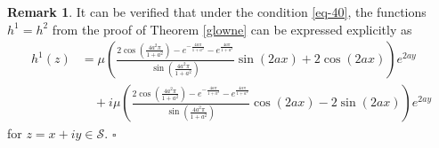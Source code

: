 \documentclass[11pt, letterpaper, reqno]{amsart}
\numberwithin{equation}{section}
\theoremstyle{definition}
\newtheorem{rem}[defi]{Remark}
\theoremstyle{plain}
\numberwithin{equation}{section}
\def\SS{\mathcal{S}}
\begin{document}
\begin{rem}
It can be verified that under the condition \eqref{eq-40}, the functions $h^{1}=h^{2}$ from the proof of Theorem \ref{glowne} can be expressed explicitly as
\begin{equation*}
\begin{aligned}
h^{1}(z) &= \mu \!\left( \frac{2 \cos\left(\frac{4a^2\pi}{1+a^2}\right) \!-\!e^{-\frac{4a\pi}{1+a^2}} \!-\! e^{\frac{4a\pi}{1+a^2}}}{\sin\left(\frac{4a^2\pi}{1+a^2}\right)} \sin(2ax) \!+\! 2 \cos(2ax)\right) \!e^{2ay} \\
& \quad +i \mu \!\left( \frac{2 \cos\left(\frac{4a^2\pi}{1+a^2}\right) \!-\! e^{-\frac{4a\pi}{1+a^2}} \!-\! e^{\frac{4a\pi}{1+a^2}}}{\sin\left(\frac{4a^2\pi}{1+a^2}\right)}  \cos(2ax) \!-\! 2 \sin(2ax)\right) \!e^{2ay}
\end{aligned}
\end{equation*}
for $z = x+iy\in\SS$. \hfill $\square$
\end{rem}
\end{document}
